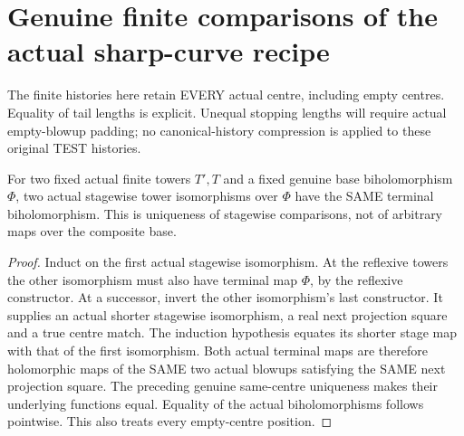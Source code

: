 \section{Genuine finite comparisons of the actual sharp-curve recipe}

The finite histories here retain EVERY actual centre, including empty
centres. Equality of tail lengths is explicit. Unequal stopping lengths
will require actual empty-blowup padding; no canonical-history
compression is applied to these original TEST histories.

\begin{theorem}
\label{hir:sharp-actual-stagewise-tower-comparison-unique}
\leanok
For two fixed actual finite towers $T',T$ and a fixed genuine base
biholomorphism $\Phi$, two actual stagewise tower isomorphisms over
$\Phi$ have the SAME terminal biholomorphism. This is uniqueness of
stagewise comparisons, not of arbitrary maps over the composite base.
\end{theorem}
\begin{proof}
Induct on the first actual stagewise isomorphism. At the reflexive towers
the other isomorphism must also have terminal map $\Phi$, by the
reflexive constructor. At a successor, invert the other isomorphism's
last constructor. It supplies an actual shorter stagewise isomorphism,
a real next projection square and a true centre match. The induction
hypothesis equates its shorter stage map with that of the first
isomorphism. Both actual terminal maps are therefore holomorphic maps
of the SAME two actual blowups satisfying the SAME next projection
square. The preceding genuine same-centre uniqueness makes their
underlying functions equal. Equality of the actual biholomorphisms
follows pointwise. This also treats every empty-centre position.
\end{proof}

